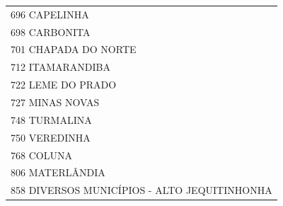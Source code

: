 \documentclass{article}
\begin{document}
\begin{longtable}[c]{m{18cm}}
\multicolumn{1}{l}{ \hspace{2em} 696 CAPELINHA } \\
\multicolumn{1}{l}{ \hspace{2em} 698 CARBONITA } \\
\multicolumn{1}{l}{ \hspace{2em} 701 CHAPADA DO NORTE } \\
\multicolumn{1}{l}{ \hspace{2em} 712 ITAMARANDIBA } \\
\multicolumn{1}{l}{ \hspace{2em} 722 LEME DO PRADO } \\
\multicolumn{1}{l}{ \hspace{2em} 727 MINAS NOVAS } \\
\multicolumn{1}{l}{ \hspace{2em} 748 TURMALINA } \\
\multicolumn{1}{l}{ \hspace{2em} 750 VEREDINHA } \\
\multicolumn{1}{l}{ \hspace{2em} 768 COLUNA } \\
\multicolumn{1}{l}{ \hspace{2em} 806 MATERLÂNDIA } \\
\multicolumn{1}{l}{ \hspace{2em} 858 DIVERSOS MUNICÍPIOS - ALTO JEQUITINHONHA } \\
\end{longtable}
\newpage
\end{document}
